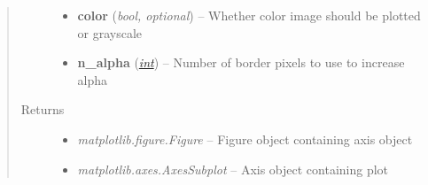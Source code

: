\documentclass[letterpaper,10pt,english]{sphinxmanual}
\begin{document}
\begin{fulllineitems}
\begin{quote}
\begin{description}
\begin{itemize}
\item {} 
\textbf{color} (\emph{bool, optional}) -- Whether color image should be plotted or grayscale

\item {} 
\textbf{n\_alpha} (\href{http://docs.python.org/library/functions.html\#int}{\emph{int}}) -- Number of border pixels to use to increase alpha

\end{itemize}

\item[{Returns}] \leavevmode
\begin{itemize}
\item {} 
\emph{matplotlib.figure.Figure} --
Figure object containing axis object

\item {} 
\emph{matplotlib.axes.AxesSubplot} --
Axis object containing plot

\end{itemize}


\end{description}\end{quote}

\end{fulllineitems}

\end{document}

